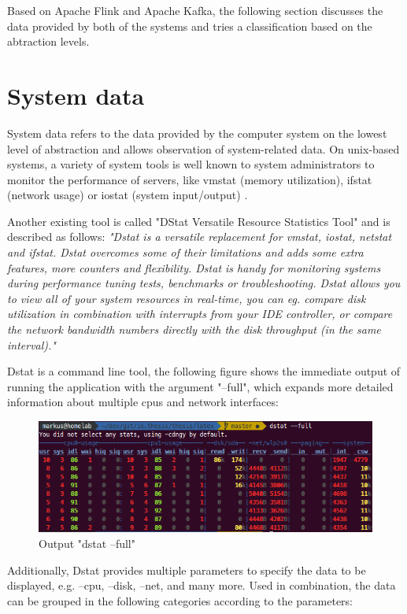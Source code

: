 Based on Apache Flink and Apache Kafka, the following section discusses the data provided
by both of the systems and tries a classification based on the abtraction levels.

\section{System data}

System data refers to the data provided by the computer system on the lowest level of
abstraction and allows observation of system-related data. On unix-based systems, a
variety of system tools is well known to system administrators to monitor the performance
of servers, like vmstat (memory utilization), ifstat (network usage) or iostat (system
input/output) \cite{Hoeb12}.

Another existing tool is called "DStat Versatile Resource Statistics Tool" and is described
as follows: \textit{"Dstat is a versatile replacement for vmstat, iostat, netstat and ifstat. Dstat
overcomes some of their limitations and adds some extra features, more counters and flexibility.
Dstat is handy for monitoring systems during performance tuning tests, benchmarks
or troubleshooting. Dstat allows you to view all of your system resources in real-time, you
can eg. compare disk utilization in combination with interrupts from your IDE controller,
or compare the network bandwidth numbers directly with the disk throughput (in the same
interval)."}\cite{Wieers16}

Dstat is a command line tool, the following figure shows the immediate output of running
the application with the argument "--full", which expands more detailed information about
multiple cpus and network interfaces:

\begin{figure}[H]
	\centering
	\includegraphics[width=1.0\textwidth]{../images/06-dstat-full.png}
	\caption{Output "dstat --full"}
	\label{dstat-output}
\end{figure}

Additionally, Dstat provides multiple parameters to specify the data to be displayed, e.g.
--cpu, --disk, --net, and many more. Used in combination, the data can be grouped in the
following categories according to the parameters:

